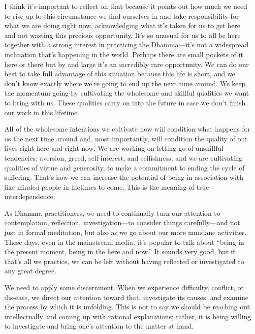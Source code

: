 I think it's important to reflect on that because it points out how 
much we need to rise up to this circumstance we find ourselves in and 
take responsibility for what we are doing right now, acknowledging what 
it's taken for us to get here and not wasting this precious 
opportunity. It's so unusual for us to all be here together with a 
strong interest in practicing the Dhamma---it's not a widespread 
inclination that's happening in the world. Perhaps there are small 
pockets of it here or there but by and large it's an incredibly rare 
opportunity. We can do our best to take full advantage of this 
situation because this life is short, and we don't know exactly where 
we're going to end up the next time around. We keep the momentum going 
by cultivating the wholesome and skillful qualities we want to bring 
with us. These qualities carry on into the future in case we don't 
finish our work in this lifetime.

All of the wholesome intentions we cultivate now will condition what
happens for us the next time around and, most \mbox{importantly,} will
condition the quality of our lives right here and right now. We are
working on letting go of unskillful tendencies: aversion, greed,
self-interest, and selfishness, and we are cultivating qualities of
virtue and generosity, to make a commitment to ending the cycle of
suffering. That's how we can increase the potential of being in
association with like-minded people in lifetimes to come. This is the
meaning of true interdependence.


As Dhamma practitioners, we need to continually turn our attention to 
contemplation, reflection, investigation---to consider things 
carefully---and not just in formal meditation, but also as we go about 
our more mundane activities. These days, even in the mainstream media, 
it's popular to talk about ``being in the present moment, being in the 
here and now.'' It sounds very good, but if that's all we practice, we 
can be left without having reflected or investigated to any great 
degree.

We need to apply some discernment. When we experience difficulty, 
conflict, or dis-ease, we direct our attention toward that, investigate 
its causes, and examine the process by which it is unfolding. This is 
not to say we should be reaching out intellectually and coming up with 
rational explanations; rather, it is being willing to investigate and 
bring one's attention to the matter at hand.

